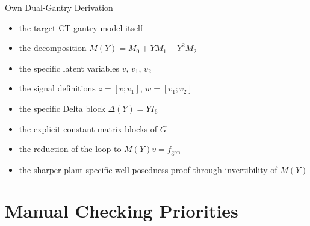 \documentclass[11pt]{article}
\begin{document}
\begin{resultbox}{Own Dual-Gantry Derivation}
\begin{itemize}[leftmargin=1.2em]
    \item the target CT gantry model itself
    \item the decomposition $M(Y) = M_0 + YM_1 + Y^2M_2$
    \item the specific latent variables $v$, $v_1$, $v_2$
    \item the signal definitions $z = [v;v_1]$, $w = [v_1;v_2]$
    \item the specific Delta block $\Delta(Y) = YI_6$
    \item the explicit constant matrix blocks of $G$
    \item the reduction of the loop to $M(Y)v = f_{\mathrm{gen}}$
    \item the sharper plant-specific well-posedness proof through invertibility
    of $M(Y)$
\end{itemize}
\end{resultbox}

\section{Manual Checking Priorities}
\end{document}

